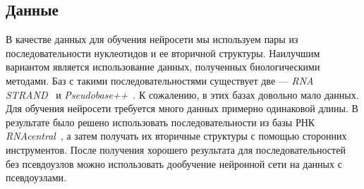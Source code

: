 \documentclass[14pt]{matmex-diploma-custom}
\begin{document}
\subsection{Данные}
В качестве данных для обучения нейросети мы используем пары из последовательности нуклеотидов и ее вторичной структуры. Наилучшим вариантом является использование данных, полученных биологическими методами. Баз с такими последовательностями существует две --- {\it RNA STRAND}~\cite{rnastrand} и {\it Pseudobase++}~\cite{pseudobase}. К сожалению, в этих базах довольно мало данных. Для обучения нейросети требуется много данных примерно одинаковой длины. В результате было решено использовать последовательности из базы РНК {\it RNAcentral}~\cite{rnacentral}, а затем получать их вторичные структуры с помощью сторонних инструментов. После получения хорошего результата для последовательностей без псевдоузлов можно использовать дообучение нейронной сети на данных с псевдоузлами.
\end{document}

